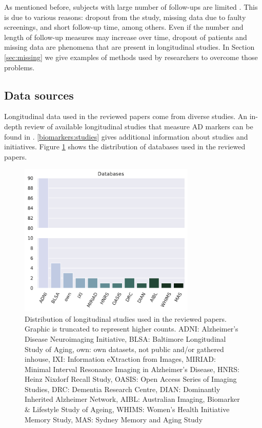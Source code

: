 As mentioned before, subjects with large number of follow-ups are limited \cite{Lawrence2017}. This is due to various reasons: dropout from the study, missing data due to faulty screenings, and short follow-up time, among others. Even if the number and length of follow-up measures may increase over time, dropout of patients and missing data are phenomena that are present in longitudinal studies. In Section \ref{sec:missing} we give examples of methods used by researchers to overcome those problems. \\

\subsection{Data sources}

Longitudinal data used in the reviewed papers come from diverse studies. An in-depth review of available longitudinal studies that measure AD markers can be found in \cite{Lawrence2017}. \ref{biomarkers:studies} gives additional information about studies and initiatives. Figure \ref{fig:db} shows the distribution of databases used in the reviewed papers.  \\

\begin{figure}[!htbp]
  \centering
  \includegraphics[width=0.75\textwidth]{figures/review/Fig5.pdf}
  \caption[Distribution of longitudinal studies used in the reviewed papers.]{\small Distribution of longitudinal studies used in the reviewed papers. Graphic is truncated to represent higher counts. ADNI: Alzheimer's Disease Neuroimaging Initiative, BLSA: Baltimore Longitudinal Study of Aging, own: own datasets, not public and/or gathered inhouse, IXI: Information eXtraction from Images, MIRIAD: Minimal Interval Resonance Imaging in Alzheimer's Disease, HNRS: Heinz Nixdorf Recall Study, OASIS: Open Access Series of Imaging Studies, DRC: Dementia Research Centre, DIAN: Dominantly Inherited Alzheimer Network, AIBL: Australian Imaging, Biomarker $\&$ Lifestyle Study of Ageing, WHIMS: Women's Health Initiative Memory Study, MAS: Sydney Memory and Aging Study}\label{fig:db}
\end{figure}

